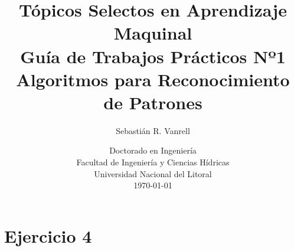 \documentclass[11pt,a4paper,final]{article}
\author{Sebastián R. Vanrell\\[3em]}
\title{\textsf{\Large Tópicos Selectos en Aprendizaje Maquinal}\\\bigskip
       \textsf{\Large Guía de Trabajos Prácticos Nº1}\\\bigskip
       \textsf{Algoritmos para Reconocimiento de Patrones}\\[3em]}
\date{Doctorado en Ingeniería\\\bigskip
      Facultad de Ingeniería y Ciencias Hídricas\\\bigskip
      Universidad Nacional del Litoral \\[5em]
      \today}
\begin{document}
\renewcommand{\tablename}{Tabla}

\maketitle
\newpage

\tableofcontents

\newpage

\section{Ejercicio 4}

%
%
%
%
%
%
\end{document}
